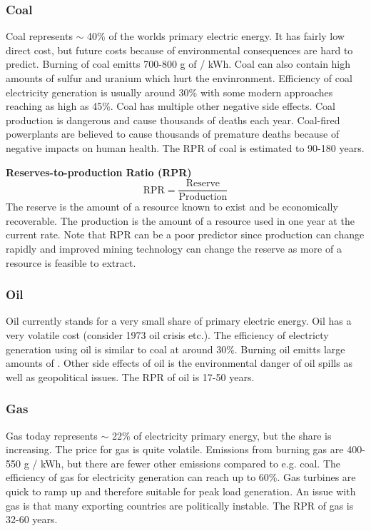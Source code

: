 \subsubsection{Coal}
Coal represents $\sim$ 40\% of the worlds primary electric energy.
It has fairly low direct cost, but future costs because of environmental consequences are hard to predict.
Burning of coal emitts 700-800 g of \cotwo / kWh. Coal can also contain high amounts of sulfur and uranium which hurt the envinronment.
Efficiency of coal electricity generation is usually around 30\% with some modern approaches reaching as high as 45\%.
Coal has multiple other negative side effects.
Coal production is dangerous and cause thousands of deaths each year.
Coal-fired powerplants are believed to cause thousands of premature deaths because of negative impacts on human health.
The RPR of coal is estimated to 90-180 years.\\

\begin{tcolorbox}
    \textbf{Reserves-to-production Ratio (RPR)}\\
    $$
    \text{RPR} = \frac{\text{Reserve}}{\text{Production}}
    $$
    The reserve is the amount of a resource known to exist and be economically recoverable.
    The production is the amount of a resource used in one year at the current rate.
    Note that RPR can be a poor predictor since production can change rapidly and improved mining technology can change the reserve as more of a resource is feasible to extract.
\end{tcolorbox}

\subsubsection{Oil}
Oil currently stands for a very small share of primary electric energy.
Oil has a very volatile cost (consider 1973 oil crisis etc.).
The efficiency of electricty generation using oil is similar to coal at around 30\%.
Burning oil emitts large amounts of \cotwo.
Other side effects of oil is the environmental danger of oil spills as well as geopolitical issues.
The RPR of oil is 17-50 years.

\subsubsection{Gas}
Gas today represents $\sim$ 22\% of electricity primary energy, but the share is increasing.
The price for gas is quite volatile.
Emissions from burning gas are 400-550 g \cotwo / kWh, but there are fewer other emissions compared to e.g. coal.
The efficiency of gas for electricity generation can reach up to 60\%.
Gas turbines are quick to ramp up and therefore suitable for peak load generation.
An issue with gas is that many exporting countries are politically instable.
The RPR of gas is 32-60 years.

